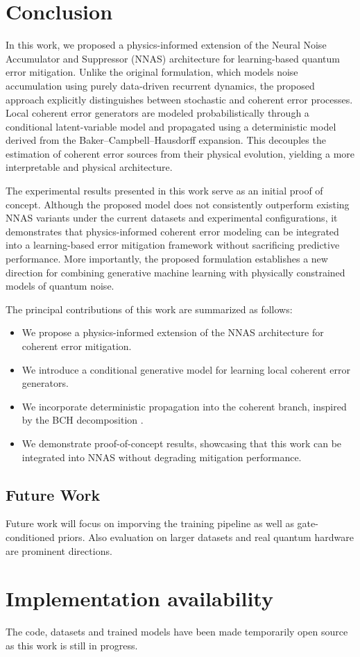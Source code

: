 \section{Conclusion}

In this work, we proposed a physics-informed extension of the Neural Noise Accumulator and Suppressor (NNAS) architecture for learning-based quantum error mitigation. Unlike the original formulation, which models noise accumulation using purely data-driven recurrent dynamics, the proposed approach explicitly distinguishes between stochastic and coherent error processes. Local coherent error generators are modeled probabilistically through a conditional latent-variable model and propagated using a deterministic model derived from the Baker--Campbell--Hausdorff expansion. This decouples the estimation of coherent error sources from their physical evolution, yielding a more interpretable and physical architecture.

The experimental results presented in this work serve as an initial proof of concept. Although the proposed model does not consistently outperform existing NNAS variants under the current datasets and experimental configurations, it demonstrates that physics-informed coherent error modeling can be integrated into a learning-based error mitigation framework without sacrificing predictive performance. More importantly, the proposed formulation establishes a new direction for combining generative machine learning with physically constrained models of quantum noise.

The principal contributions of this work are summarized as follows:

\begin{itemize}
    \item We propose a physics-informed extension of the NNAS architecture for coherent error mitigation.
    \item We introduce a conditional generative model for learning local coherent error generators.
    \item We incorporate deterministic propagation into the coherent branch, inspired by the BCH decomposition .
    \item We demonstrate proof-of-concept results, showcasing that this work can be integrated into NNAS without degrading mitigation performance.
\end{itemize}

\subsection*{Future Work}

Future work will focus on imporving the training pipeline as well as gate-conditioned priors. Also evaluation on larger datasets and real quantum hardware are prominent directions.

\section*{Implementation availability}
The code, datasets and trained models have been made temporarily open source \cite{github} as this work is still in progress.
